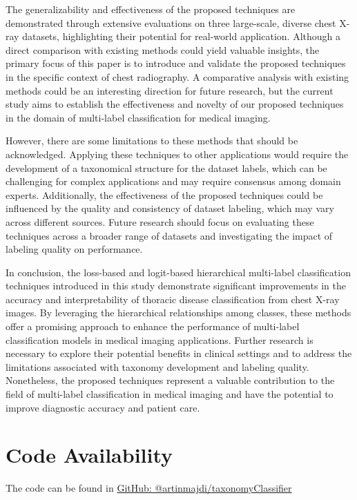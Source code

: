 \documentclass[review,1p,times,numbers]{elsarticle}
\begin{document}
The generalizability and effectiveness of the proposed techniques are demonstrated through extensive evaluations on three large-scale, diverse chest X-ray datasets, highlighting their potential for real-world application. Although a direct comparison with existing methods could yield valuable insights, the primary focus of this paper is to introduce and validate the proposed techniques in the specific context of chest radiography. A comparative analysis with existing methods could be an interesting direction for future research, but the current study aims to establish the effectiveness and novelty of our proposed techniques in the domain of multi-label classification for medical imaging.

However, there are some limitations to these methods that should be acknowledged. Applying these techniques to other applications would require the development of a taxonomical structure for the dataset labels, which can be challenging for complex applications and may require consensus among domain experts. Additionally, the effectiveness of the proposed techniques could be influenced by the quality and consistency of dataset labeling, which may vary across different sources. Future research should focus on evaluating these techniques across a broader range of datasets and investigating the impact of labeling quality on performance.

In conclusion, the loss-based and logit-based hierarchical multi-label classification techniques introduced in this study demonstrate significant improvements in the accuracy and interpretability of thoracic disease classification from chest X-ray images. By leveraging the hierarchical relationships among classes, these methods offer a promising approach to enhance the performance of multi-label classification models in medical imaging applications. Further research is necessary to explore their potential benefits in clinical settings and to address the limitations associated with taxonomy development and labeling quality. Nonetheless, the proposed techniques represent a valuable contribution to the field of multi-label classification in medical imaging and have the potential to improve diagnostic accuracy and patient care.
\section*{Code Availability}
The code can be found in \href{https://github.com/artinmajdi/taxonomyClassifier}{GitHub: @artinmajdi/taxonomyClassifier}

% 

\end{document}
